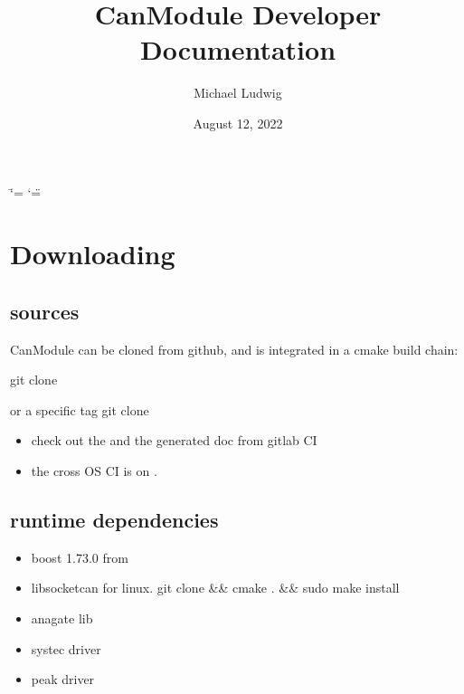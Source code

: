 \documentclass[a4paper,10pt,english]{sphinxmanual}
\title{CanModule Developer Documentation}
\date{August 12, 2022}
\author{Michael Ludwig}
\begin{document}
\ifdefined\shorthandoff
  \ifnum\catcode`\=\string=\active\shorthandoff{=}\fi
  \ifnum\catcode`\"=\active{}\fi
\fi

\pagestyle{empty}
\sphinxmaketitle
\pagestyle{plain}
\sphinxtableofcontents
\pagestyle{normal}
\label{\detokenize{index::doc}}



\chapter{Downloading}
\label{\detokenize{downloading:downloading}}\label{\detokenize{downloading::doc}}

\section{sources}
\label{\detokenize{downloading:sources}}
\sphinxAtStartPar
CanModule can be cloned from github, and is integrated in a cmake build chain:

\sphinxAtStartPar
git clone 

\sphinxAtStartPar
or a specific tag
git clone  
\begin{itemize}
\item {} 
\sphinxAtStartPar
check out the  and the generated doc from gitlab CI

\item {} 
\sphinxAtStartPar
the cross OS CI is on  .

\end{itemize}


\section{runtime dependencies}
\label{\detokenize{downloading:runtime-dependencies}}\begin{itemize}
\item {} 
\sphinxAtStartPar
boost 1.73.0 from 

\item {} 
\sphinxAtStartPar
libsocketcan for linux.
git clone  \&\& cmake . \&\& sudo make install

\item {} 
\sphinxAtStartPar
anagate lib

\item {} 
\sphinxAtStartPar
systec driver

\item {} 
\sphinxAtStartPar
peak driver

\end{itemize}
\end{document}
